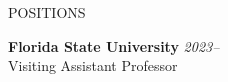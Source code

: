 

\begin{rSection}{POSITIONS}
	
	{\bf Florida State University} \hfill 
	{\em 2023--} 
	\\ 
	Visiting Assistant Professor \smallskip
	
	
\end{rSection}


